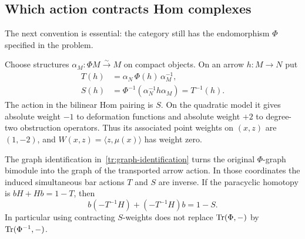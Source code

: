\subsection{Which action contracts Hom complexes}

The next convention is essential: the category still has the
endomorphism $\Phi$ specified in the problem.

\begin{lemma}
\label{mod:frobenius}
\label{mod:hom-action}
Choose structures $\alpha_M:\Phi M\xrightarrow{\sim}M$ on compact
objects. On an arrow $h:M\to N$ put
\begin{align}
 T(h)&=\alpha_N\,\Phi(h)\,\alpha_M^{-1},\label{mod:T}\\
 S(h)&=\Phi^{-1}(\alpha_N^{-1}h\alpha_M)=T^{-1}(h).
 \label{mod:S}
\end{align}
The action in the bilinear Hom pairing is $S$. On the quadratic
model it gives absolute weight $-1$ to deformation functions and
absolute weight $+2$ to degree-two obstruction operators. Thus its
associated point weights on $(x,z)$ are $(1,-2)$, and
$W(x,z)=\langle z,\mu(x)\rangle$ has weight zero.

The graph identification in~\eqref{tr:graph-identification} turns
the original $\Phi$-graph bimodule into the graph of the transported
arrow action. In those coordinates the induced simultaneous bar
actions $T$ and $S$ are inverse. If the paracyclic homotopy is
$bH+Hb=1-T$, then
\begin{equation}
\label{mod:inverse-homotopy}
 b(-T^{-1}H)+(-T^{-1}H)b=1-S.
\end{equation}
In particular using contracting $S$-weights does not replace
$\operatorname{Tr}(\Phi,-)$ by $\operatorname{Tr}(\Phi^{-1},-)$.
\end{lemma}

